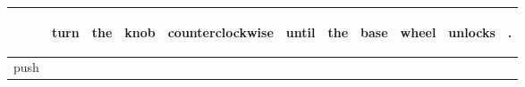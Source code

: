 \documentclass[landscape]{article}
\newcommand{\ssp}{\hspace{2pt}}
\begin{document}
\newpage

\noindent\begin{tabular}{|l|p{10pt}|p{10pt}|p{10pt}|p{10pt}|p{10pt}|p{10pt}|p{10pt}|p{10pt}|p{10pt}|p{10pt}|}
\hline
&\begin{sideways}\cellcolor{ref0}turn\hspace{12pt}\end{sideways}&\begin{sideways}\cellcolor{ref1}the\hspace{12pt}\end{sideways}&\begin{sideways}\cellcolor{ref2}knob\hspace{12pt}\end{sideways}&\begin{sideways}\cellcolor{ref3}counterclockwise\hspace{12pt}\end{sideways}&\begin{sideways}\cellcolor{ref4}until\hspace{12pt}\end{sideways}&\begin{sideways}\cellcolor{ref5}the\hspace{12pt}\end{sideways}&\begin{sideways}\cellcolor{ref6}base\hspace{12pt}\end{sideways}&\begin{sideways}\cellcolor{ref7}wheel\hspace{12pt}\end{sideways}&\begin{sideways}\cellcolor{ref8}unlocks\hspace{12pt}\end{sideways}&\begin{sideways}\cellcolor{ref9}.\hspace{12pt}\end{sideways}\\
\hline
\ssp push \ssp&\hspace{2pt}&\hspace{2pt}&\hspace{2pt}&\hspace{2pt}&\hspace{2pt}&\hspace{2pt}&\hspace{2pt}&\hspace{2pt}&\hspace{2pt}&\hspace{2pt}\\

\end{tabular}
\end{document}

